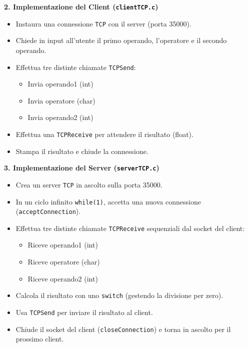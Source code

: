 \documentclass[11pt]{article}
\begin{document}
\begin{tcolorbox}[colback=green!5!white,colframe=green!75!black,title=\textbf{RISPOSTA}, breakable]
\textbf{2. Implementazione del Client (\texttt{clientTCP.c})}
\begin{itemize}
    \item Instaura una connessione \texttt{TCP} con il server (porta 35000).
    \item Chiede in input all'utente il primo operando, l'operatore e il secondo operando.
    \item Effettua tre distinte chiamate \texttt{TCPSend}:
    \begin{itemize}
        \item Invia operando1 (int)
        \item Invia operatore (char)
        \item Invia operando2 (int)
    \end{itemize}
    \item Effettua una \texttt{TCPReceive} per attendere il risultato (float).
    \item Stampa il risultato e chiude la connessione.
\end{itemize}

\textbf{3. Implementazione del Server (\texttt{serverTCP.c})}
\begin{itemize}
    \item Crea un server \texttt{TCP} in ascolto sulla porta 35000.
    \item In un ciclo infinito \texttt{while(1)}, accetta una nuova connessione (\texttt{acceptConnection}).
    \item Effettua tre distinte chiamate \texttt{TCPReceive} sequenziali dal socket del client:
    \begin{itemize}
        \item Riceve operando1 (int)
        \item Riceve operatore (char)
        \item Riceve operando2 (int)
    \end{itemize}
    \item Calcola il risultato con uno \texttt{switch} (gestendo la divisione per zero).
    \item Usa \texttt{TCPSend} per inviare il risultato al client.
    \item Chiude il socket del client (\texttt{closeConnection}) e torna in ascolto per il prossimo client.
\end{itemize}
\end{tcolorbox}
\end{document}
